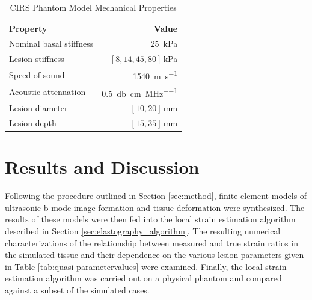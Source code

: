 			\begin{table}[!t]
				\centering
				\caption{CIRS Phantom Model Mechanical Properties}
				\label{tab:phantomproperties}
				\begin{tabular}{lr}
					\toprule
					Property & Value \\
					\midrule
					Nominal basal stiffness & \SI{25}{\kPa} \\
					Lesion stiffness &  $[8, 14, 45, 80]$\,\si{\kPa} \\
					Speed of sound & \SI{1540}{\metre\per\second} \\
					Acoustic attenuation & \SI{0.5}{\decibel\per\cm\per\MHz} \\
					Lesion diameter & $[10, 20]$\,\si{\mm} \\
					Lesion depth & $[15, 35]$\,\si{\mm} \\
					\bottomrule
				\end{tabular}
			\end{table}

	\section{Results and Discussion}
		Following the procedure outlined in Section \ref{sec:method}, finite-element models of ultrasonic b-mode image formation and tissue deformation were synthesized. The results of these models were then fed into the local strain estimation algorithm described in Section \ref{sec:elastography_algorithm}. The resulting numerical characterizations of the relationship between measured and true strain ratios in the simulated tissue and their dependence on the various lesion parameters given in Table \ref{tab:quasi-parametervalues} were examined. Finally, the local strain estimation algorithm was carried out on a physical phantom and compared against a subset of the simulated cases.

